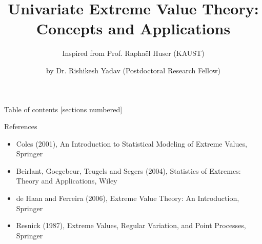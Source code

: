 \documentclass[10pt, hyperref={colorlinks = true,linkcolor = blue}]{beamer}
\title{Univariate Extreme Value Theory: Concepts
and Applications}
\subtitle{Inspired from Prof. Rapha\"el Huser (KAUST)}
\date{}
\author{by Dr. Rishikesh Yadav (Postdoctoral Research Fellow)}
\institute{HEC Montr\'eal, McGill University, Canada \\
}
\begin{document}
\maketitle

\begin{frame}{Table of contents}
  [sections numbered]
  \tableofcontents%
\end{frame}
 \begin{frame}[fragile]{References}
 \begin{itemize}
  \setlength\itemsep{1em}
\item Coles (2001), An Introduction to Statistical Modeling of Extreme
Values, Springer
\item Beirlant, Goegebeur, Teugels and Segers (2004), Statistics of
Extremes: Theory and Applications, Wiley
\item de Haan and Ferreira (2006), Extreme Value Theory: An Introduction,
Springer
\item Resnick (1987), Extreme Values, Regular Variation, and Point
Processes, Springer
\end{itemize}
\end{frame}
\end{document}
